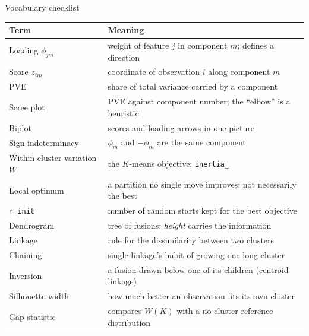 \documentclass[aspectratio=169,11pt]{beamer}
\begin{document}
\begin{frame}{Vocabulary checklist}
  \footnotesize
  \begin{tabular}{@{}ll@{}}
    \toprule
    \textbf{Term} & \textbf{Meaning} \\
    \midrule
    Loading $\phi_{jm}$ & weight of feature $j$ in component $m$; defines a direction \\
    Score $z_{im}$ & coordinate of observation $i$ along component $m$ \\
    PVE & share of total variance carried by a component \\
    Scree plot & PVE against component number; the ``elbow'' is a heuristic \\
    Biplot & scores and loading arrows in one picture \\
    Sign indeterminacy & $\phi_m$ and $-\phi_m$ are the same component \\
    Within-cluster variation $W$ & the $K$-means objective; \texttt{inertia\_} \\
    Local optimum & a partition no single move improves; not necessarily the best \\
    \texttt{n\_init} & number of random starts kept for the best objective \\
    Dendrogram & tree of fusions; \emph{height} carries the information \\
    Linkage & rule for the dissimilarity between two clusters \\
    Chaining & single linkage's habit of growing one long cluster \\
    Inversion & a fusion drawn below one of its children (centroid linkage) \\
    Silhouette width & how much better an observation fits its own cluster \\
    Gap statistic & compares $W(K)$ with a no-cluster reference distribution \\
    \bottomrule
  \end{tabular}
\end{frame}
\end{document}
